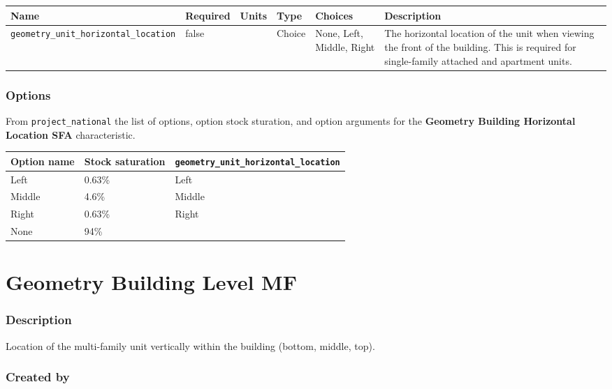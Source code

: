 \begin{longtable}[]{@{}llllll@{}}
\toprule\noalign{}
Name & Required & Units & Type & Choices & Description \\
\midrule\noalign{}
\endhead
\bottomrule\noalign{}
\endlastfoot
\texttt{geometry\_unit\_horizontal\_location} & false & & Choice & None,
Left, Middle, Right & The horizontal location of the unit when viewing
the front of the building. This is required for single-family attached
and apartment units. \\
\end{longtable}

\subsubsection{Options}\label{options-45}

From \texttt{project\_national} the list of options, option stock
sturation, and option arguments for the \textbf{Geometry Building
Horizontal Location SFA} characteristic.

\begin{longtable}[]{@{}lll@{}}
\toprule\noalign{}
Option name & Stock saturation &
\texttt{geometry\_unit\_horizontal\_location} \\
\midrule\noalign{}
\endhead
\bottomrule\noalign{}
\endlastfoot
Left & 0.63\% & Left \\
Middle & 4.6\% & Middle \\
Right & 0.63\% & Right \\
None & 94\% & \\
\end{longtable}

\section{Geometry Building Level
MF}\label{geometry_building_level_mf}

\subsubsection{Description}\label{description-46}

Location of the multi-family unit vertically within the building
(bottom, middle, top).

\subsubsection{Created by}\label{created-by-46}

